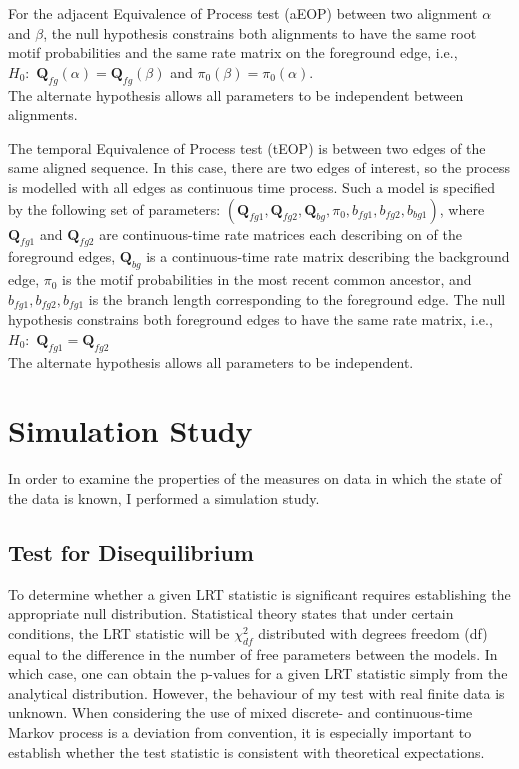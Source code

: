 For the adjacent Equivalence of Process test (aEOP) between two alignment $\alpha$ and $\beta$, the null hypothesis constrains both alignments to have the same root motif probabilities and the same rate matrix on the foreground edge, i.e.,  \\
$H_0:$ $\bm{Q}_{fg}(\alpha) = \bm{Q}_{fg}(\beta)$ and $\pi_0(\beta) = \pi_0(\alpha)$. \\
\noindent
The alternate hypothesis allows all parameters to be independent between alignments. 

The temporal Equivalence of Process test (tEOP) is between two edges of the same aligned sequence. In this case, there are two edges of interest, so the process is modelled with all edges as continuous time process. Such a model is specified by the following set of parameters: $( \bm{Q}_{fg1}, \bm{Q}_{fg2}, \bm{Q}_{bg}, \pi_{0}, b_{fg1}, b_{fg2}, b_{bg1}) $, where $\bm{Q}_{fg1}$ and $\bm{Q}_{fg2}$ are continuous-time rate matrices each describing on of the foreground edges,  $\bm{Q}_{bg}$ is a continuous-time rate matrix describing the background edge, $\pi_{0}$ is the motif probabilities in the most recent common ancestor, and $ b_{fg1}, b_{fg2}, b_{fg1}$ is the branch length corresponding to the foreground edge. The null hypothesis constrains both foreground edges to have the same rate matrix, i.e., \\
$H_0:$ $\bm{Q}_{fg1} = \bm{Q}_{fg2}$  \\ 
The alternate hypothesis allows all parameters to be independent. 


\section{Simulation Study}
In order to examine the properties of the measures on data in which the state of the data is known, I performed a simulation study. 


\subsection{Test for Disequilibrium}

 

To determine whether a given LRT statistic is significant requires establishing the appropriate null distribution. Statistical theory states that under certain conditions, the LRT statistic will be $\chi^2_{df}$ distributed with degrees freedom (df) equal to the difference in the number of free parameters between the models. In which case, one can obtain the p-values for a given LRT statistic simply from the analytical distribution. However, the behaviour of my test with real finite data is unknown. When considering the use of mixed discrete- and continuous-time Markov process is a deviation from convention, it is especially important to establish whether the test statistic is consistent with theoretical expectations. 

